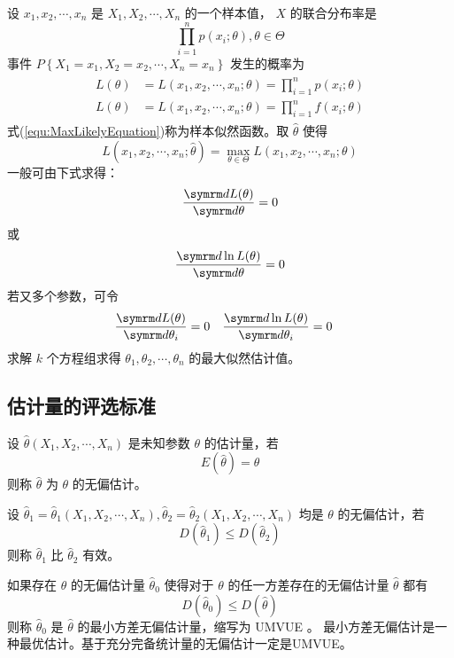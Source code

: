  设 $ x_1, x_2, \cdots, x_n $ 是 $ X_1, X_2, \cdots, X_n $ 的一个样本值， $ X $ 的联合分布率是
$$ \prod_{i=1}^{n} p(x_i;\theta), \theta \in \Theta $$
事件 $ P\left\{ X_1 = x_1, X_2 = x_2, \cdots, X_n = x_n \right\} $ 发生的概率为
\begin{align}
    \begin{split}
        \label{equ:MaxLikelyEquation}
        L(\theta) & = L(x_1, x_2, \cdots, x_n;\theta) = \prod_{i=1}^{n} p(x_i;\theta) \\
        L(\theta) & = L(x_1, x_2, \cdots, x_n;\theta) = \prod_{i=1}^{n} f(x_i;\theta) 
    \end{split}
\end{align}
式(\ref{equ:MaxLikelyEquation})称为样本似然函数。取 $ \hat{\theta} $ 使得
$$ L(x_1, x_2, \cdots, x_n;\hat{\theta}) = \max_{\theta \in \Theta} L(x_1, x_2, \cdots, x_n;\theta) $$
一般可由下式求得：
\begin{equation}
    \frac{\diff L(\theta)}{\diff \theta} = 0
\end{equation}
或
\begin{equation}
    \frac{\diff \ln L(\theta)}{\diff \theta} = 0
\end{equation}
若又多个参数，可令
\begin{align}
    \frac{\diff L(\theta)}{\diff \theta_i} & = 0 & \frac{\diff \ln L(\theta)}{\diff \theta_i} & = 0
\end{align}
求解 $ k $ 个方程组求得 $ \theta_1, \theta_2, \cdots, \theta_n $ 的最大似然估计值。

\subsection{估计量的评选标准}

 设 $ \hat{\theta}(X_1, X_2, \cdots, X_n) $ 是未知参数 $ \theta $ 的估计量，若
\begin{equation}
    E(\hat{\theta}) = \theta
\end{equation}
则称 $ \hat{\theta} $ 为 $ \theta $ 的无偏估计。

 设 $ \hat{\theta}_1 = \hat{\theta}_1(X_1, X_2, \cdots, X_n),\hat{\theta}_2 = \hat{\theta}_2(X_1, X_2, \cdots, X_n) $
均是 $ \theta $ 的无偏估计，若
\begin{equation}
    D(\hat{\theta}_1) \leqslant D(\hat{\theta}_2)
\end{equation}
则称 $ \hat{\theta}_1 $ 比 $ \hat{\theta}_2 $ 有效。

 如果存在 $ \theta $ 的无偏估计量 $ \hat{\theta}_0 $ 使得对于 $ \theta $ 的任一方差存在的无偏估计量
$ \hat{\theta} $ 都有
\begin{equation}
    D(\hat{\theta}_0) \leqslant D(\hat{\theta})
\end{equation}
则称 $ \hat{\theta}_0 $ 是 $ \hat{\theta} $ 的最小方差无偏估计量，缩写为 UMVUE 。
最小方差无偏估计是一种最优估计。基于充分完备统计量的无偏估计一定是UMVUE。

